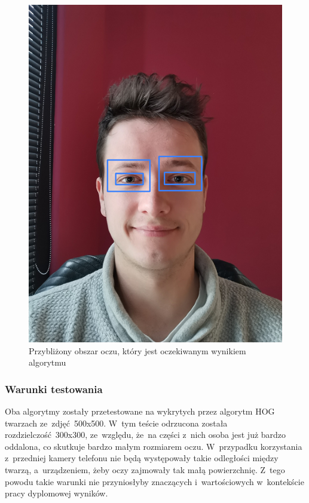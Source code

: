 \begin{figure}[!h]
    \begin{center}
        \includegraphics[scale=0.6]{img/pupil_section/expected_eyes_region.png}
        \caption{Przybliżony obszar oczu, który jest oczekiwanym wynikiem algorytmu}
        \label{fig:expected_eyes_region}
    \end{center}
\end{figure}

\subsubsection{Warunki testowania}

Oba algorytmy zostały przetestowane na wykrytych przez algorytm HOG twarzach ze~zdjęć~500x500. W~tym teście odrzucona została rozdzielczość~300x300, ze~względu, że~na części z~nich osoba jest już bardzo oddalona, co skutkuje bardzo małym rozmiarem oczu. W~przypadku korzystania z~przedniej kamery telefonu nie będą występowały takie odległości między twarzą, a~urządzeniem, żeby oczy zajmowały tak małą powierzchnię. Z~tego powodu takie warunki nie przyniosłyby znaczących i~wartościowych w~kontekście pracy dyplomowej wyników. 

